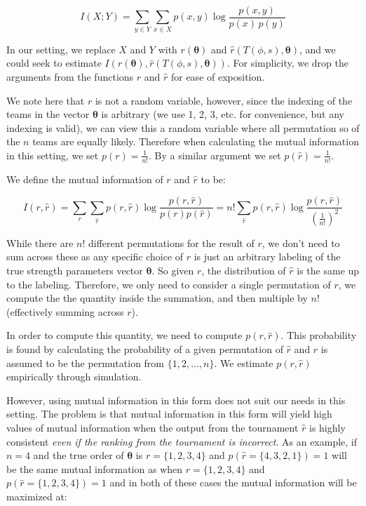 \documentclass[
  12pt,
]{article}
\begin{document}
\[
I(X;Y)=\sum_{y\in Y}\sum_{x\in X}p(x,y)\log \frac {p(x,y)}{p(x)\,p(y)}
\]

In our setting, we replace \(X\) and \(Y\) with
\(r(\boldsymbol{\theta})\) and
\(\hat{r}(T(\phi, s),\boldsymbol{\theta})\), and we could seek to
estimate
\(I(r(\boldsymbol{\theta}),\hat{r}(T(\phi, s),\boldsymbol{\theta}))\).
For simplicity, we drop the arguments from the functions \(r\) and
\(\hat{r}\) for ease of exposition.

We note here that \(r\) is not a random variable, however, since the
indexing of the teams in the vector \(\boldsymbol{\theta}\) is arbitrary
(we use 1, 2, 3, etc. for convenience, but any indexing is valid), we
can view this a random variable where all permutation so of the \(n\)
teams are equally likely. Therefore when calculating the mutual
information in this setting, we set \(p(r) = \frac{1}{n!}\). By a
similar argument we set \(p(\hat{r}) = \frac{1}{n!}\).

We define the mutual information of \(r\) and \(\hat{r}\) to be:

\[
I(r,\hat{r})=\sum_{r}\sum_{\hat{r}}p(r,\hat{r})\log \frac {p(r,\hat{r})}{p(r)p(\hat{r})} = n!\sum_{\hat{r}}p(r,\hat{r})\log \frac {p(r,\hat{r})}{(\frac{1}{n!})^2}
\]

While there are \(n!\) different permutations for the result of \(r\),
we don't need to sum across these as any specific choice of \(r\) is
just an arbitrary labeling of the true strength parameters vector
\(\boldsymbol{\theta}\). So given \(r\), the distribution of \(\hat{r}\)
is the same up to the labeling. Therefore, we only need to consider a
single permutation of \(r\), we compute the the quantity inside the
summation, and then multiple by \(n!\) (effectively summing across
\(r\)).

In order to compute this quantity, we need to compute \(p(r,\hat{r})\).
This probability is found by calculating the probability of a given
permutation of \(\hat{r}\) and \(r\) is assumed to be the permutation
from \(\{1, 2, \ldots, n\}\). We estimate \(p(r,\hat{r})\) empirically
through simulation.

However, using mutual information in this form does not suit our needs
in this setting. The problem is that mutual information in this form
will yield high values of mutual information when the output from the
tournament \(\hat{r}\) is highly consistent \emph{even if the ranking
from the tournament is incorrect}. As an example, if \(n=4\) and the
true order of \(\boldsymbol{\theta}\) is \(r = \{1, 2, 3, 4\}\) and
\(p(\hat{r} = \{4, 3, 2, 1\}) = 1\) will be the same mutual information
as when \(r = \{1, 2, 3, 4\}\) and \(p(\hat{r} = \{1, 2, 3, 4\}) = 1\)
and in both of these cases the mutual information will be maximized at:
\end{document}
